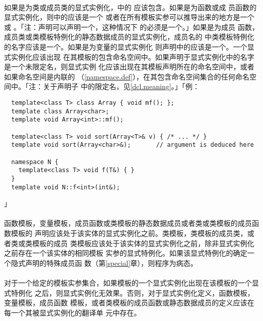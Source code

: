 \paragraph{}
如果是为类或成员类的显式实例化，中的
应该包含。如果是为函数或成
员函数的显式实例化，则中的应该是一个
或者在所有模板实参可以推导出来的地方是一个或
。「注：声明可以声明一个，这种情况下
的必须是一个。」如果是为成员
函数，成员类或类模板特例化的静态数据成员的显式实例化，成员名的
中类模板特例化的名字应该是一个。如果是为变量的显式实例化
则声明中的应该是一个。一个显式实例化应该出现
在其模板的包含命名空间中。如果声明于显式实例化中的名字是一个未限定名，则显式实例
化应该出现在其模板声明所在的命名空间中，或者如果命名空间是内联的
（\ref{namespace.def}），在其包含命名空间集合的任何命名空间中。「注：关于声明子
中的限定名，见\ref{dcl.meaning}。」「例：
\begin{lstlisting}
  template<class T> class Array { void mf(); };
  template class Array<char>;
  template void Array<int>::mf();

  template<class T> void sort(Array<T>& v) { /* ... */ }
  template void sort(Array<char>&);       // argument is deduced here

  namespace N {
    template<class T> void f(T&) { }
  }
  template void N::f<int>(int&);
\end{lstlisting}」

\paragraph{}
函数模板，变量模板，成员函数或类模板的静态数据成员或者类或类模板的成员函数模板的
声明应该处于该实体的显式实例化之前。类模板，类模板的成员类，或者类或类模板的成员
类模板应该处于该实体的显式实例化之前，除非显式实例化之前存在一个该实体的相同模板
实参的显式特例化。如果该显式特例化的确定一个隐式声明的特殊成员函
数（第\ref{special}章），则程序为病态。

\paragraph{}
对于一个给定的模板实参集合，如果模板的一个显式实例化出现在该模板的一个显式特例化
之后，则显式实例化无效果。否则，对于显式实例化定义，函数模板，变量模板，成员函数
模板，或者类模板的成员函数或静态数据成员的定义应该在每一个其被显式实例化的翻译单
元中存在。


